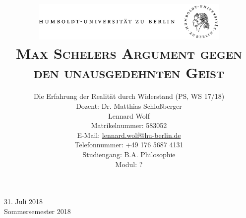 \documentclass[a4paper, 12pt]{article}
\date{\vspace{-3ex}}
\begin{document}
\title{\vspace{5ex}
	\includegraphics*[bb=0 0 720 200, width=0.72\textwidth]{ErstesSem/images/hu_logo.png}\\
	\vspace{30pt}
	\scshape\LARGE{Max Schelers Argument gegen den unausgedehnten Geist}\\\vspace{20pt}}
	


\author{Die Erfahrung der Realität durch Widerstand (PS, WS 17/18)\\
	\vspace{7pt}
          Dozent: Dr. Matthias Schloßberger\\\vspace{4pt}Lennard Wolf\\
        \small{Matrikelnummer: 583052}\\
        \small{E-Mail: \href{mailto:lennard.wolf@hu-berlin.de}{lennard.wolf@hu-berlin.de}}\\
        \small{Telefonnummer: +49 176 5687 4131}\\
        \small{Studiengang: B.A. Philosophie}\\
        \small{Modul: ?}}

\maketitle

\vspace{\fill}

\begin{minipage}[]{0.92\textwidth}
    \centering
    \onehalfspacing
    \large   
    31. Juli 2018\\
    Sommersemester 2018

    \vspace{-20mm} 
\end{minipage}%
\thispagestyle{empty}
\newpage
\setcounter{page}{1}
\end{document}
